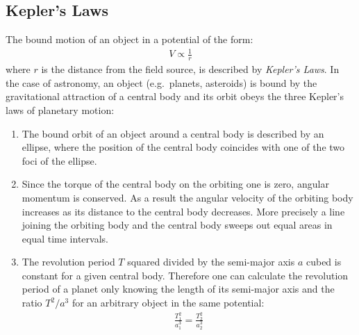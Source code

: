 \documentclass[11pt, a4paper]{article}
\numberwithin{equation}{section}
\begin{document}
\subsection{Kepler's Laws}
The bound motion of an object in a potential of the form:
\begin{align}
	V \propto \frac{1}{r}
\end{align}
where $r$ is the distance from the field source, is described by \emph{Kepler's Laws}.
In the case of astronomy, an object (e.g.\ planets, asteroids) is bound by the gravitational attraction of a central body and its orbit obeys the three Kepler's laws of planetary motion:
\begin{enumerate}
	\item The bound orbit of an object around a central body is described by an ellipse, where the position of the central body coincides with one of the two foci of the ellipse.
	
	\item Since the torque of the central body on the orbiting one is zero, angular momentum is conserved. As a result the angular velocity of the orbiting body increases as its distance to the central body decreases.
	More precisely a line joining the orbiting body and the central body sweeps out equal areas in equal time intervals.
	
	\item The revolution period $T$ squared divided by the semi-major axis $a$ cubed is constant for a given central body.
	Therefore one can calculate the revolution period of a planet only knowing the length of its semi-major axis and the ratio $T^2/a^3$ for an arbitrary object in the same potential:
	\begin{align}
		\frac{T_1^2}{a_1^3} = \frac{T_2^2}{a_2^3}
	\end{align}
\end{enumerate}
\end{document}
